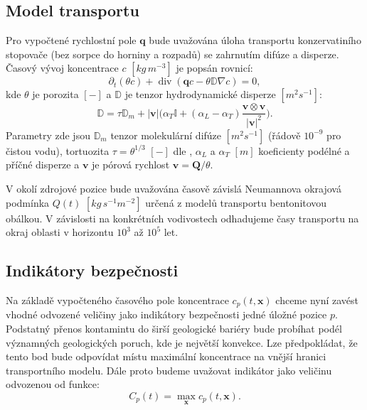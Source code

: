 \documentclass{article}
\def\abs#1{\lvert#1\rvert}
\def\prtl{\partial}
\def\grad{\nabla}
\def\div{\operatorname{div}}
\def\vc#1{\mathbf{\boldsymbol{#1}}}     %
\def\tn#1{{\mathbb{#1}}}    %
\begin{document}
\subsection{Model transportu}
\label{sec:stopovac}
Pro vypočtené rychlostní pole $\vc q$ bude uvažována úloha transportu konzervatiního stopovače (bez sorpce do horniny a rozpadů) 
se zahrnutím difúze a disperze. Časový vývoj koncentrace $c$ $[kg\, m^{-3}]$ je popsán rovnicí:
\[
   \prtl_t (\theta c) + \div( \vc q c - \theta \tn D \grad c) = 0,
\]
kde $\theta$ je porozita $[-]$ a $\tn D$ je tenzor hydrodynamické disperze $[m^2s^{-1}]$:
\[
  \tn D = \tau\tn D_m + \abs{\vc v}\Big(\alpha_T \tn I + (\alpha_L - \alpha_T)\frac{\vc v \otimes \vc v}{\abs{\vc v}^2}\Big).
\]
Parametry zde jsou $\tn D_m$ tenzor molekulární difúze $[m^2s^{-1}]$ (řádově $10^{-9}$ pro čistou vodu), 
tortuozita $\tau=\theta^{1/3}$ $[-]$ dle \cite{millington_quirk}, $\alpha_L$ a $\alpha_T$ $[m]$ koeficienty podélné a příčné disperze
a $\vc v$ je pórová rychlost $\vc v = \vc Q / \theta$.

V okolí zdrojové pozice bude uvažována časově závislá Neumannova okrajová podmínka $Q(t)$ $[kg\, s^{-1}m^{-2}]$
určená z modelů transportu bentonitovou obálkou. V závislosti na konkrétních vodivostech odhadujeme časy 
transportu na okraj oblasti v horizontu $10^3$ až $10^5$ let. 



\subsection{Indikátory bezpečnosti}
Na základě vypočteného časového pole koncentrace $c_p(t, \vc x)$ chceme nyní zavést vhodné odvozené veličiny jako indikátory bezpečnosti 
jedné úložné pozice $p$. Podstatný přenos kontamintu do širší geologické bariéry bude probíhat podél významných geologických poruch, 
kde je největší konvekce. Lze předpokládat, že tento bod bude odpovídat místu maximální koncentrace na vnější hranici transportního modelu. 
Dále proto budeme uvažovat indikátor jako veličinu odvozenou od funkce:
\[
  C_p(t) = \max_{\vc x} c_p(t, \vc x).
\]
\end{document}
